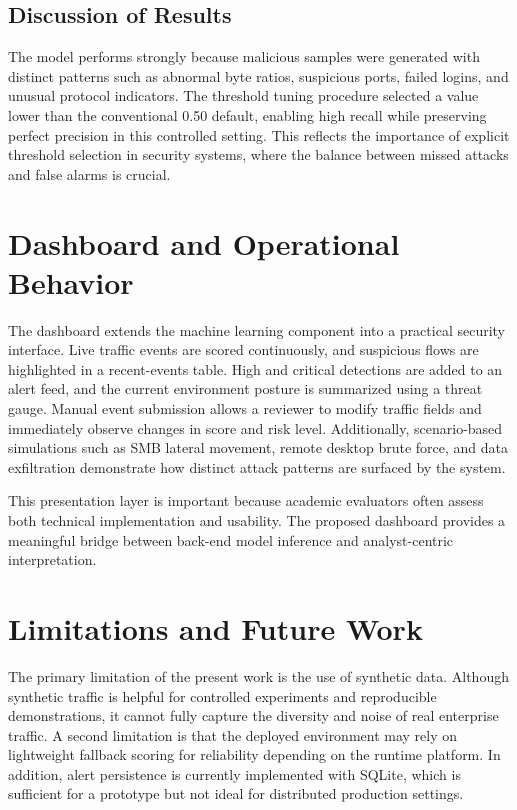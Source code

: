 \documentclass[conference]{IEEEtran}
\begin{document}
\subsection{Discussion of Results}
The model performs strongly because malicious samples were generated with distinct patterns such as abnormal byte ratios, suspicious ports, failed logins, and unusual protocol indicators. The threshold tuning procedure selected a value lower than the conventional 0.50 default, enabling high recall while preserving perfect precision in this controlled setting. This reflects the importance of explicit threshold selection in security systems, where the balance between missed attacks and false alarms is crucial.

\section{Dashboard and Operational Behavior}
The dashboard extends the machine learning component into a practical security interface. Live traffic events are scored continuously, and suspicious flows are highlighted in a recent-events table. High and critical detections are added to an alert feed, and the current environment posture is summarized using a threat gauge. Manual event submission allows a reviewer to modify traffic fields and immediately observe changes in score and risk level. Additionally, scenario-based simulations such as SMB lateral movement, remote desktop brute force, and data exfiltration demonstrate how distinct attack patterns are surfaced by the system.

This presentation layer is important because academic evaluators often assess both technical implementation and usability. The proposed dashboard provides a meaningful bridge between back-end model inference and analyst-centric interpretation.

\section{Limitations and Future Work}
The primary limitation of the present work is the use of synthetic data. Although synthetic traffic is helpful for controlled experiments and reproducible demonstrations, it cannot fully capture the diversity and noise of real enterprise traffic. A second limitation is that the deployed environment may rely on lightweight fallback scoring for reliability depending on the runtime platform. In addition, alert persistence is currently implemented with SQLite, which is sufficient for a prototype but not ideal for distributed production settings.
\end{document}
